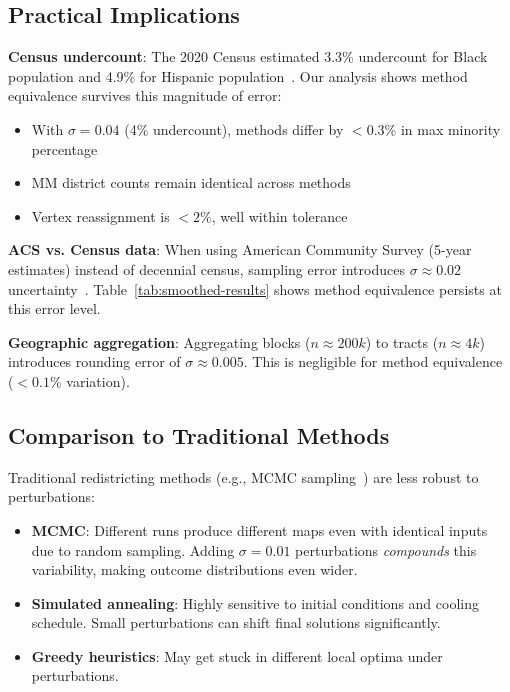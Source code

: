 \subsection{Practical Implications}

\textbf{Census undercount}: The 2020 Census estimated 3.3\% undercount for Black population and 4.9\% for Hispanic population~\cite{census2020undercount}. Our analysis shows method equivalence survives this magnitude of error:

\begin{itemize}
    \item With $\sigma = 0.04$ (4\% undercount), methods differ by $< 0.3\%$ in max minority percentage
    \item MM district counts remain identical across methods
    \item Vertex reassignment is $< 2\%$, well within tolerance
\end{itemize}

\textbf{ACS vs. Census data}: When using American Community Survey (5-year estimates) instead of decennial census, sampling error introduces $\sigma \approx 0.02$ uncertainty~\cite{acs2020}. Table~\ref{tab:smoothed-results} shows method equivalence persists at this error level.

\textbf{Geographic aggregation}: Aggregating blocks ($n \approx 200k$) to tracts ($n \approx 4k$) introduces rounding error of $\sigma \approx 0.005$. This is negligible for method equivalence ($< 0.1\%$ variation).

\subsection{Comparison to Traditional Methods}

Traditional redistricting methods (e.g., MCMC sampling~\cite{duchin2018gerrymandering}) are less robust to perturbations:

\begin{itemize}
    \item \textbf{MCMC}: Different runs produce different maps even with identical inputs due to random sampling. Adding $\sigma = 0.01$ perturbations \textit{compounds} this variability, making outcome distributions even wider.

    \item \textbf{Simulated annealing}: Highly sensitive to initial conditions and cooling schedule. Small perturbations can shift final solutions significantly.

    \item \textbf{Greedy heuristics}: May get stuck in different local optima under perturbations.
\end{itemize}

